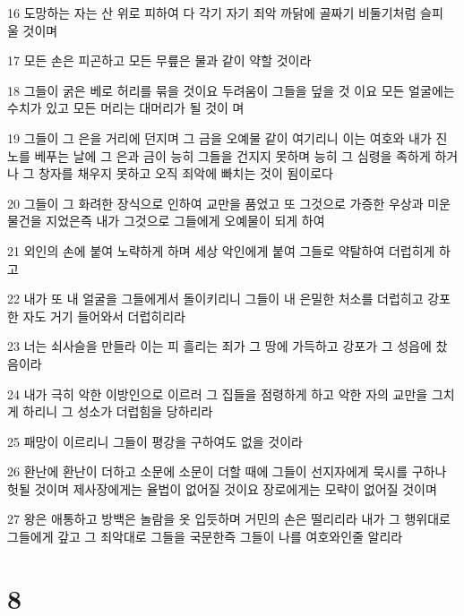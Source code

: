 \par 16 도망하는 자는 산 위로 피하여 다 각기 자기 죄악 까닭에 골짜기 비둘기처럼 슬피 울 것이며
\par 17 모든 손은 피곤하고 모든 무릎은 물과 같이 약할 것이라
\par 18 그들이 굵은 베로 허리를 묶을 것이요 두려움이 그들을 덮을 것 이요 모든 얼굴에는 수치가 있고 모든 머리는 대머리가 될 것이 며
\par 19 그들이 그 은을 거리에 던지며 그 금을 오예물 같이 여기리니 이는 여호와 내가 진노를 베푸는 날에 그 은과 금이 능히 그들을 건지지 못하며 능히 그 심령을 족하게 하거나 그 창자를 채우지 못하고 오직 죄악에 빠치는 것이 됨이로다
\par 20 그들이 그 화려한 장식으로 인하여 교만을 품었고 또 그것으로 가증한 우상과 미운 물건을 지었은즉 내가 그것으로 그들에게 오예물이 되게 하여
\par 21 외인의 손에 붙여 노략하게 하며 세상 악인에게 붙여 그들로 약탈하여 더럽히게 하고
\par 22 내가 또 내 얼굴을 그들에게서 돌이키리니 그들이 내 은밀한 처소를 더럽히고 강포한 자도 거기 들어와서 더럽히리라
\par 23 너는 쇠사슬을 만들라 이는 피 흘리는 죄가 그 땅에 가득하고 강포가 그 성읍에 찼음이라
\par 24 내가 극히 악한 이방인으로 이르러 그 집들을 점령하게 하고 악한 자의 교만을 그치게 하리니 그 성소가 더럽힘을 당하리라
\par 25 패망이 이르리니 그들이 평강을 구하여도 없을 것이라
\par 26 환난에 환난이 더하고 소문에 소문이 더할 때에 그들이 선지자에게 묵시를 구하나 헛될 것이며 제사장에게는 율법이 없어질 것이요 장로에게는 모략이 없어질 것이며
\par 27 왕은 애통하고 방백은 놀람을 옷 입듯하며 거민의 손은 떨리리라 내가 그 행위대로 그들에게 갚고 그 죄악대로 그들을 국문한즉 그들이 나를 여호와인줄 알리라

\chapter{8}

